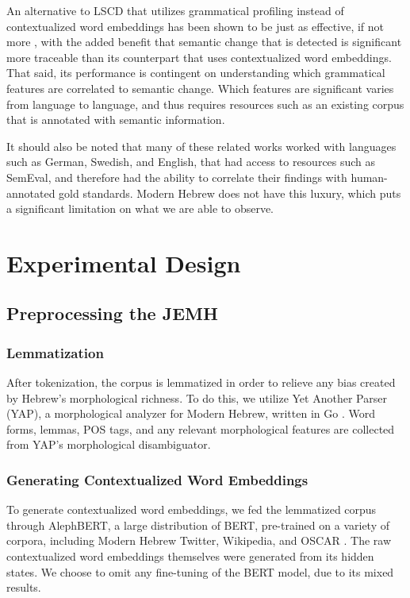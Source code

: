 \documentclass[10pt, a4paper]{article}
\begin{document}
An alternative to LSCD that utilizes grammatical profiling instead of contextualized word embeddings has been shown to be just as effective, if not more \cite{grammaticalprofiling}, with the added benefit that semantic change that is detected is significant more traceable than its counterpart that uses contextualized word embeddings. That said, its performance is contingent on understanding which grammatical features are correlated to semantic change. Which features are significant varies from language to language, and thus requires resources such as an existing corpus that is annotated with semantic information.

It should also be noted that many of these related works worked with languages such as German, Swedish, and English, that had access to resources such as SemEval, and therefore had the ability to correlate their findings with human-annotated gold standards. Modern Hebrew does not have this luxury, which puts a significant limitation on what we are able to observe.
\section{Experimental Design}

\subsection{Preprocessing the JEMH}

\subsubsection{Lemmatization}
After tokenization, the corpus is lemmatized in order to relieve any bias created by Hebrew's morphological richness\cite{Laicher2021}. To do this, we utilize Yet Another Parser (YAP), a morphological analyzer for Modern Hebrew, written in Go \cite{yap}. Word forms, lemmas, POS tags, and any relevant morphological features are collected from YAP's morphological disambiguator. 
\subsubsection{Generating Contextualized Word Embeddings}
To generate contextualized word embeddings, we fed the lemmatized corpus through AlephBERT, a large distribution of BERT, pre-trained on a variety of corpora, including Modern Hebrew Twitter, Wikipedia, and OSCAR \cite{alephBERT}. The raw contextualized word embeddings themselves were generated from its hidden states. We choose to omit any fine-tuning of the BERT model, due to its mixed results.
\end{document}
